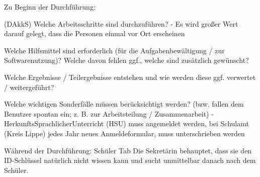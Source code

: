 Zu Beginn der Durchführung:	






















(DAkkS) Welche Arbeitsschritte sind durchzuführen?
- Es wird großer Wert darauf gelegt, dass die Personen einmal vor Ort erscheinen








Welche Hilfsmittel sind erforderlich (für die Aufgabenbewältigung / zur Softwarenutzung)? Welche davon fehlen ggf., welche sind zusätzlich gewünscht?	



















Welche Ergebnisse / Teilergebnisse entstehen und wie werden diese ggf. verwertet / weitergeführt?













Welche wichtigen Sonderfälle müssen berücksichtigt werden? (bzw. fallen dem Benutzer spontan ein; z. B. zur Arbeitsteilung / Zusammenarbeit)	
- HerkunftsSprachlicherUnterricht (HSU) muss angemeldet werden, bei Schulamt (Kreis Lippe) jedes Jahr neues Anmeldeformular, muss unterschrieben werden














Während der Durchführung:
Schüler Tab
Die Sekretärin behauptet, dass sie den ID-Schlüssel natürlich nicht wissen kann und sucht unmittelbar danach nach dem Schüler.





















